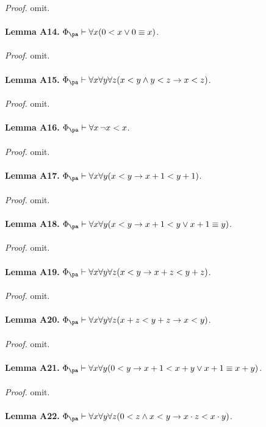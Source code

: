 \ \\
\textit{Proof.} omit.\\
\ \\
\textbf{Lemma A14.} $\Phi_\pa \vdash \forall x (0 < x \lor 0 \equiv x)$.\\
\ \\
\textit{Proof.} omit.\\
\ \\
\textbf{Lemma A15.} $\Phi_\pa \vdash \forall x \forall y \forall z (x < y \land y < z \rightarrow x < z)$.\\
\ \\
\textit{Proof.} omit.\\
\ \\
\textbf{Lemma A16.} $\Phi_\pa \vdash \forall x \, \neg x < x$.\\
\ \\
\textit{Proof.} omit.\\
\ \\
\textbf{Lemma A17.} $\Phi_\pa \vdash \forall x \forall y (x < y \rightarrow x + 1 < y + 1)$.\\
\ \\
\textit{Proof.} omit.\\
\ \\
\textbf{Lemma A18.} $\Phi_\pa \vdash \forall x \forall y (x < y \rightarrow x + 1 < y \lor x + 1 \equiv y)$.\\
\ \\
\textit{Proof.} omit.\\
\ \\
\textbf{Lemma A19.} $\Phi_\pa \vdash \forall x \forall y \forall z (x < y \rightarrow x + z < y + z)$.\\
\ \\
\textit{Proof.} omit.\\
\ \\
\textbf{Lemma A20.} $\Phi_\pa \vdash \forall x \forall y \forall z (x + z < y + z \rightarrow x < y)$.\\
\ \\
\textit{Proof.} omit.\\
\ \\
\textbf{Lemma A21.} $\Phi_\pa \vdash \forall x \forall y (0 < y \rightarrow x + 1 < x + y \lor x + 1 \equiv x + y)$.\\
\ \\
\textit{Proof.} omit.\\
\ \\
\textbf{Lemma A22.} $\Phi_\pa \vdash \forall x \forall y \forall z (0 < z \land x < y \rightarrow x \cdot z < x \cdot y)$.\\
